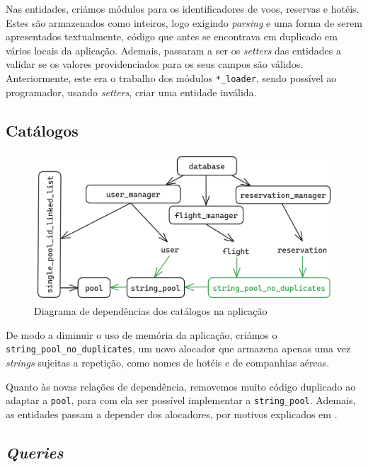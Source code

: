 \documentclass[11pt, a4paper]{article}
\begin{document}
Nas entidades, criámos módulos para os identificadores de voos, reservas e hotéis. Estes são
armazenados como inteiros, logo exigindo \emph{parsing} e uma forma de serem apresentados
textualmente, código que antes se encontrava em duplicado em vários locais da aplicação. Ademais,
passaram a ser os \emph{setters} das entidades a validar se os valores providenciados para os seus
campos são válidos. Anteriormente, este era o trabalho dos módulos \texttt{*\_loader}, sendo
possível ao programador, usando \emph{setters}, criar uma entidade inválida.

\subsection{Catálogos}
\label{sec:catalogs}

\begin{figure}[ht]
    \centering
    \includegraphics[scale=0.17]{res-fase2/database.png}
    \caption{Diagrama de dependências dos catálogos na aplicação}
    \label{fig:catalogs}
\end{figure}

De modo a diminuir o uso de memória da aplicação, criámos o \texttt{string\_pool\_no\_duplicates},
um novo alocador que armazena apenas uma vez \emph{strings} sujeitas a repetição, como nomes de
hotéis e de companhias aéreas.

Quanto às novas relações de dependência, removemos muito código duplicado ao adaptar a
\texttt{pool}, para com ela ser possível implementar a \texttt{string\_pool}. Ademais, as entidades
passam a depender dos alocadores, por motivos explicados em
.

\subsection{\emph{Queries}}
\label{sec:queries}
\end{document}
